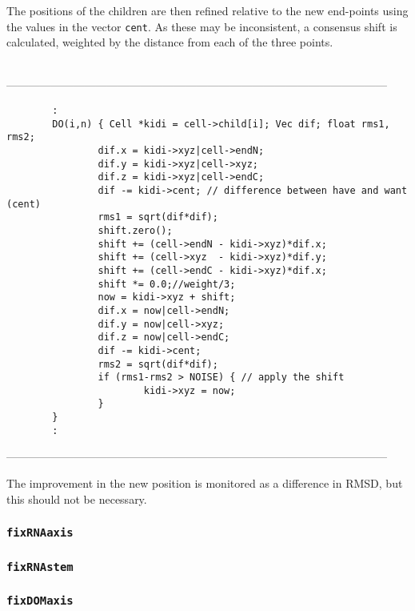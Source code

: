 The positions of the children are then refined relative to the new end-points using the values in
the vector {\tt cent}.   As these may be inconsistent, a consensus shift is calculated, weighted
by the distance from each of the three points.
\begin{singlespace}
\ \\
------------------------------------------------------------------------------------------------------
\begin{tiny}
\begin{verbatim}
        :
        DO(i,n) { Cell *kidi = cell->child[i]; Vec dif; float rms1, rms2;
                dif.x = kidi->xyz|cell->endN;
                dif.y = kidi->xyz|cell->xyz;
                dif.z = kidi->xyz|cell->endC;
                dif -= kidi->cent; // difference between have and want (cent) 
                rms1 = sqrt(dif*dif);
                shift.zero();
                shift += (cell->endN - kidi->xyz)*dif.x;
                shift += (cell->xyz  - kidi->xyz)*dif.y;
                shift += (cell->endC - kidi->xyz)*dif.x;
                shift *= 0.0;//weight/3;
                now = kidi->xyz + shift;
                dif.x = now|cell->endN;
                dif.y = now|cell->xyz;
                dif.z = now|cell->endC;
                dif -= kidi->cent;
                rms2 = sqrt(dif*dif);
                if (rms1-rms2 > NOISE) { // apply the shift
                        kidi->xyz = now;
                }
        }
        :
\end{verbatim}
\end{tiny}
------------------------------------------------------------------------------------------------------
\end{singlespace}
The improvement in the new position is monitored as a difference in RMSD, but this should
not be necessary.

\subsubsection{{\tt fixRNAaxis}}


\subsubsection{{\tt fixRNAstem}}


\subsubsection{{\tt fixDOMaxis}}


